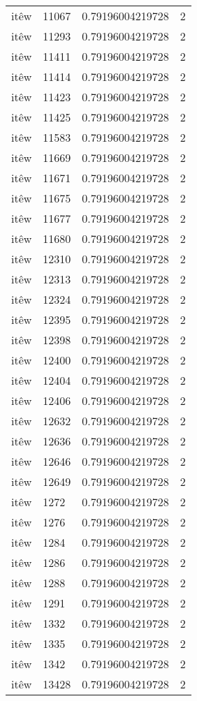 \begin{longtable}{llll}
itêw & 11067 & 0.79196004219728 & 2\\
itêw & 11293 & 0.79196004219728 & 2\\
itêw & 11411 & 0.79196004219728 & 2\\
itêw & 11414 & 0.79196004219728 & 2\\
itêw & 11423 & 0.79196004219728 & 2\\
itêw & 11425 & 0.79196004219728 & 2\\
itêw & 11583 & 0.79196004219728 & 2\\
itêw & 11669 & 0.79196004219728 & 2\\
itêw & 11671 & 0.79196004219728 & 2\\
itêw & 11675 & 0.79196004219728 & 2\\
itêw & 11677 & 0.79196004219728 & 2\\
itêw & 11680 & 0.79196004219728 & 2\\
itêw & 12310 & 0.79196004219728 & 2\\
itêw & 12313 & 0.79196004219728 & 2\\
itêw & 12324 & 0.79196004219728 & 2\\
itêw & 12395 & 0.79196004219728 & 2\\
itêw & 12398 & 0.79196004219728 & 2\\
itêw & 12400 & 0.79196004219728 & 2\\
itêw & 12404 & 0.79196004219728 & 2\\
itêw & 12406 & 0.79196004219728 & 2\\
itêw & 12632 & 0.79196004219728 & 2\\
itêw & 12636 & 0.79196004219728 & 2\\
itêw & 12646 & 0.79196004219728 & 2\\
itêw & 12649 & 0.79196004219728 & 2\\
itêw & 1272 & 0.79196004219728 & 2\\
itêw & 1276 & 0.79196004219728 & 2\\
itêw & 1284 & 0.79196004219728 & 2\\
itêw & 1286 & 0.79196004219728 & 2\\
itêw & 1288 & 0.79196004219728 & 2\\
itêw & 1291 & 0.79196004219728 & 2\\
itêw & 1332 & 0.79196004219728 & 2\\
itêw & 1335 & 0.79196004219728 & 2\\
itêw & 1342 & 0.79196004219728 & 2\\
itêw & 13428 & 0.79196004219728 & 2\\

\end{longtable}

